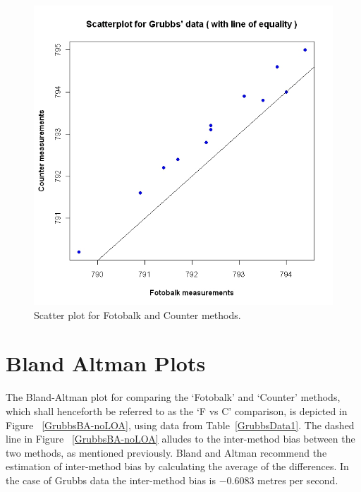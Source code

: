 \documentclass[12pt, a4paper]{report}
\theoremstyle{plain}
\theoremstyle{definition}
\theoremstyle{remark}
\begin{document}
	\begin{figure}[h!]
		\begin{center}
			\includegraphics[width=125mm]{images/GrubbsScatter.jpeg}
			\caption{Scatter plot for Fotobalk and Counter methods.}\label{GrubbsScatter}
		\end{center}
	\end{figure}

\section{Bland Altman Plots}
	
The Bland-Altman plot for comparing the `Fotobalk' and `Counter' methods, which shall henceforth be referred to as the `F vs C' comparison, is depicted in Figure ~\ref{GrubbsBA-noLOA}, using data from Table~\ref{GrubbsData1}. The dashed line in Figure ~\ref{GrubbsBA-noLOA} alludes to the inter-method bias between the two methods, as mentioned previously. Bland and Altman recommend the estimation of inter-method bias by calculating the	average of the differences. In the case of Grubbs data the inter-method bias is $-0.6083$ metres per second.
\end{document}
